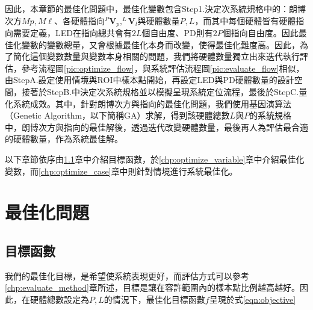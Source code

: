 因此，本章節的最佳化問題中，最佳化變數包含Step1.決定次系統規格中的：朗博次方$Mp,M\ell$、各硬體指向$^{P}\boldsymbol{V}_p,^{L}\boldsymbol{V}_l$與硬體數量$P,L$，而其中每個硬體皆有硬體指向需要定義，LED在指向總共會有$2L$個自由度、PD則有$2P$個指向自由度。因此最佳化變數的變數總量，又會根據最佳化本身而改變，使得最佳化難度高。因此，為了簡化這個變數數量與變數本身相關的問題，我們將硬體數量獨立出來迭代執行評估，參考流程圖\ref{pic:optimize_flow}，與系統評估流程圖\ref{pic:evaluate_flow}相似，由StepA.設定使用情境與ROI中樣本點開始，再設定LED與PD硬體數量的設計空間，接著於StepB.中決定次系統規格並以模擬呈現系統定位流程，最後於StepC.量化系統成效。其中，針對朗博次方與指向的最佳化問題，我們使用基因演算法（Genetic Algorithm，以下簡稱GA）求解，得到該硬體總數$L$與$P$的系統規格中，朗博次方與指向的最佳解後，透過迭代改變硬體數量，最後再人為評估最合適的硬體數量，作為系統最佳解。






以下章節依序由\ref{chp:objective}章中介紹目標函數，於\ref{chp:optimize_variable}章中介紹最佳化變數，而\ref{chp:optimize_case}章中則針對情境進行系統最佳化。

\section{最佳化問題}
\label{chp:optimize}
    \subsection{目標函數}
    \label{chp:objective}

    我們的最佳化目標，是希望使系統表現更好，而評估方式可以參考\ref{chp:evaluate_method}章所述，目標是讓在容許範圍內的樣本點比例越高越好。因此，在硬體總數設定為$P,L$的情況下，最佳化目標函數$f$呈現於式\ref{eqn:objective}

